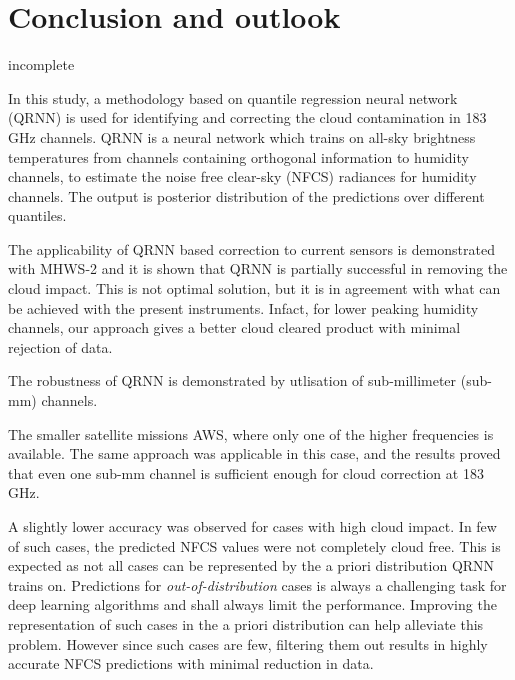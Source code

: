 \documentclass[amt, manuscript]{copernicus}
\newcommand{\todo}[1]{{\color{red} #1}}
\begin{document}
\section{Conclusion and outlook}  %
%

\todo {incomplete} 


In this study, a methodology based on quantile regression neural network (QRNN) is used for identifying and correcting the cloud contamination in 183\,GHz channels. QRNN is a neural network which trains on all-sky brightness temperatures from  channels containing orthogonal information to humidity channels, to estimate the noise free clear-sky (NFCS) radiances for humidity channels. The output is posterior distribution of the predictions over different quantiles. 
 
The applicability of QRNN based correction to current sensors is demonstrated with MHWS-2 and it is shown that QRNN  is partially successful in removing the cloud impact. This is not optimal solution, but it is in agreement with what can be achieved with the present instruments. Infact, for lower peaking humidity channels, our approach gives a better cloud cleared product with minimal rejection of data. 

The robustness of QRNN is  demonstrated by utlisation of sub-millimeter (sub-mm) channels. 

The smaller satellite missions AWS, where only one of the higher frequencies is available. The same approach was applicable in this case, and the results proved that even one sub-mm channel is sufficient enough for cloud correction at 183\,GHz.

A slightly lower accuracy was observed for cases with high cloud impact. In few of such cases, the predicted NFCS values were not completely cloud free. This is expected as not all cases can be represented by the a priori distribution QRNN trains on. Predictions for \textit{out-of-distribution} cases is always a challenging task for deep learning algorithms and  shall always limit the performance. Improving the representation of such cases in the a priori distribution can help alleviate this problem. However since such cases are few, filtering them out results in highly accurate NFCS predictions with minimal reduction in data.
\end{document}

